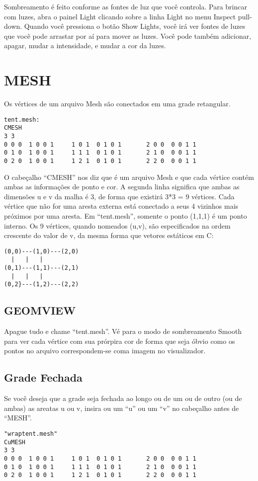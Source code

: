 \documentclass[12pt,a4paper]{book}
\begin{document}
Sombreamento é feito conforme as fontes de luz que você controla.
Para brincar com luzes, abra o painel Light clicando sobre a linha
Light no menu Inspect pull-down. Quando você pressiona o botão Show Lights,
você irá ver fontes de luzes que você pode arrastar por aí para mover as luzes.
Você pode também adicionar, apagar, mudar a intensidade, e mudar a
cor da luzes.

\chapter{MESH}

Os vértices de um arquivo Mesh são conectados em uma grade retangular.

\begin{verbatim}
tent.mesh:
CMESH
3 3
0 0 0  1 0 0 1	   1 0 1  0 1 0 1	    2 0 0  0 0 1 1
0 1 0  1 0 0 1	   1 1 1  0 1 0 1	    2 1 0  0 0 1 1
0 2 0  1 0 0 1	   1 2 1  0 1 0 1	    2 2 0  0 0 1 1
\end{verbatim}

O cabeçalho ``CMESH'' nos diz que é um arquivo Mesh e que cada vértice
contém ambas as informações de ponto e cor.  A segunda linha significa que
ambas as dimensões u e v da malha é 3, de forma que existirá 3*3 =
9 vértices. Cada vértice que não for uma aresta externa está conectado a
seus 4 vizinhos mais próximos por uma aresta. Em ``tent.mesh'', somente o
ponto (1,1,1) é um ponto interno. Os 9 vértices, quando nomeados (u,v),
são especificados na ordem crescente do valor de v, da mesma forma que vetores estáticos em C:

\begin{verbatim}
(0,0)---(1,0)---(2,0)   
  |	  |	  |
(0,1)---(1,1)---(2,1)
  |	  |	  |
(0,2}---(1,2)---(2,2)
\end{verbatim}

\section{GEOMVIEW}

Apague tudo e chame ``tent.mesh''. Vé para o modo de sombreamento Smooth para
ver cada vértice com sua prórpira cor de forma que seja óbvio como os pontos no
arquivo correspondem-se coma imagem no visualizador.

\section{Grade Fechada}

Se você deseja que a grade seja fechada ao longo ou de um ou de outro (ou de ambas) as areatas
u ou v, insira ou um ``u'' ou um ``v'' no cabeçalho antes de
``MESH''.
\begin{verbatim}
"wraptent.mesh" 
CuMESH
3 3
0 0 0  1 0 0 1	   1 0 1  0 1 0 1	    2 0 0  0 0 1 1
0 1 0  1 0 0 1	   1 1 1  0 1 0 1	    2 1 0  0 0 1 1
0 2 0  1 0 0 1	   1 2 1  0 1 0 1	    2 2 0  0 0 1 1
\end{verbatim}
\end{document}
